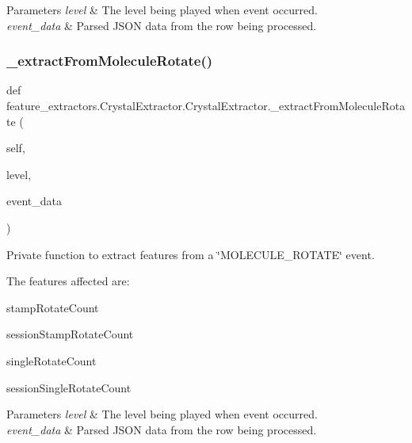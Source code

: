 \begin{DoxyParams}{Parameters}
{\em level} & The level being played when event occurred. \\
\hline
{\em event\+\_\+data} & Parsed J\+S\+ON data from the row being processed. \\
\hline
\end{DoxyParams}
\mbox{\label{classfeature__extractors_1_1_crystal_extractor_1_1_crystal_extractor_ad9596536a08c941fdad97c72ab2262fe}} 
\subsubsection{\texorpdfstring{\_extractFromMoleculeRotate()}{\_extractFromMoleculeRotate()}}
{\footnotesize\ttfamily def feature\+\_\+extractors.\+Crystal\+Extractor.\+Crystal\+Extractor.\+\_\+extract\+From\+Molecule\+Rotate (\begin{DoxyParamCaption}\item[{}]{self,  }\item[{}]{level,  }\item[{}]{event\+\_\+data }\end{DoxyParamCaption})\hspace{0.3cm}{\ttfamily [private]}}



Private function to extract features from a \char`\"{}\+M\+O\+L\+E\+C\+U\+L\+E\+\_\+\+R\+O\+T\+A\+T\+E\char`\"{} event. 

The features affected are\+:
\begin{DoxyItemize}
\item stamp\+Rotate\+Count
\item session\+Stamp\+Rotate\+Count
\item single\+Rotate\+Count
\item session\+Single\+Rotate\+Count
\end{DoxyItemize}


\begin{DoxyParams}{Parameters}
{\em level} & The level being played when event occurred. \\
\hline
{\em event\+\_\+data} & Parsed J\+S\+ON data from the row being processed. \\
\hline
\end{DoxyParams}
\mbox{\label{classfeature__extractors_1_1_crystal_extractor_1_1_crystal_extractor_a6663edde4eaa797cbd1d46c87aec0b36}} 
